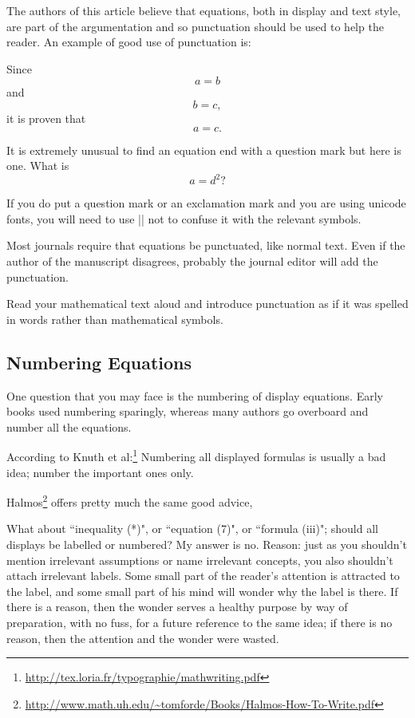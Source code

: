 {{{{The authors of this article believe that equations, both in display and text style, are part of the argumentation
and so punctuation should be used to help the reader. An example of good use of punctuation is:


Since
\[ a=b \]
and
\[ b=c,\]
it is proven that
\[ a =c. \]

It is extremely unusual to find an equation end with a question mark but here is one. What is 
\[ a = d^2\mathrm{?} \]

If you do put a question mark or an exclamation mark and you are using unicode fonts,
you will need to use || not to confuse it with the relevant symbols.

Most journals require that equations be punctuated, like normal text. Even if the author of the manuscript disagrees, probably the journal editor will add the punctuation.

Read your mathematical text aloud and introduce punctuation as if it was spelled in words rather than mathematical symbols. 

\subsection{Numbering Equations}

One question that you may face is the numbering of display equations. Early books used numbering sparingly, whereas many authors go overboard and number all the equations.

According to Knuth et al:\footnote{\url{http://tex.loria.fr/typographie/mathwriting.pdf}}
Numbering all displayed formulas is usually a bad idea; number the important ones only.

Halmos\footnote{\url{http://www.math.uh.edu/~tomforde/Books/Halmos-How-To-Write.pdf}} offers pretty much the same good advice,

\begin{latexquotation}
What about ``inequality (*)", or ``equation (7)", or ``formula (iii)"; should all displays be labelled or numbered? My answer is no. Reason: just as you shouldn't mention irrelevant assumptions or name irrelevant concepts, you also shouldn't attach irrelevant labels. Some small part of the reader's attention is attracted to the label, and some small part of his mind will wonder why the label is there. If there is a reason, then the wonder serves a healthy purpose by way of preparation, with no fuss, for a future reference to the same idea; if there is no reason, then the attention and the wonder were wasted.
\end{latexquotation}

}}}}
